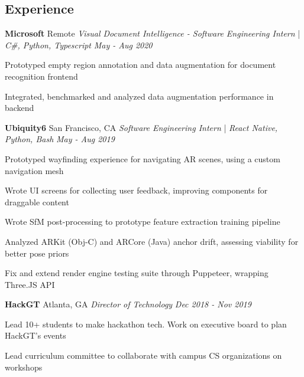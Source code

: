 \subsection*{Experience}
\headerrow
	{\textbf{Microsoft}}
    {Remote}
\headerrow
	{\emph{Visual Document Intelligence - Software Engineering Intern} |
    \emph{C\#, Python, Typescript}}
    {\emph{May - Aug 2020}}
\begin{itemize*}
	\item Prototyped empty region annotation and data augmentation for document recognition frontend
    \item Integrated, benchmarked and analyzed data augmentation performance in backend
\end{itemize*}
\headerrow
	{\textbf{Ubiquity6}}
    {San Francisco, CA}
\headerrow
	{\emph{Software Engineering Intern} |
    \emph{React Native, Python, Bash}}
    {\emph{May - Aug 2019}}
\begin{itemize*}
	\item Prototyped wayfinding experience for navigating AR scenes, using a custom navigation mesh
    \item Wrote UI screens for collecting user feedback, improving components for draggable content
    \item Wrote SfM post-processing to prototype feature extraction training pipeline
    \item Analyzed ARKit (Obj-C) and ARCore (Java) anchor drift, assessing viability for better pose priors
    \item Fix and extend render engine testing suite through Puppeteer, wrapping Three.JS API
\end{itemize*}
\headerrow
    {\textbf{HackGT}}
    {Atlanta, GA}
\headerrow
    {\emph{Director of Technology}}{\emph{ Dec 2018 - Nov 2019}}
\begin{itemize*}
    \item Lead 10+ students to make hackathon tech. Work on executive board to plan HackGT's events
    \item Lead curriculum committee to collaborate with campus CS organizations on workshops
\end{itemize*}

